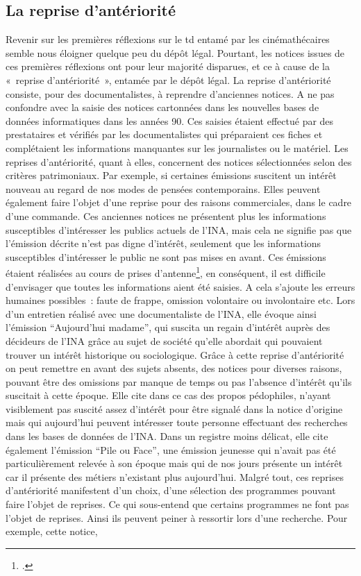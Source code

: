 \subsection{La reprise d'antériorité}

Revenir sur les premières réflexions sur le \gls{td} entamé par les cinémathécaires semble nous éloigner quelque peu du dépôt légal. Pourtant, les notices issues de ces premières réflexions ont pour leur majorité disparues, et ce à cause de la « reprise d’antériorité », entamée par le dépôt légal. La reprise d’antériorité consiste, pour des documentalistes, à reprendre d’anciennes notices. A ne pas confondre avec la saisie des notices cartonnées dans les nouvelles bases de données informatiques dans les années 90. Ces saisies étaient effectué par des prestataires et vérifiés par les documentalistes qui préparaient ces fiches et complétaient les informations manquantes sur les journalistes ou le matériel. Les reprises d'antériorité, quant à elles, concernent des notices sélectionnées selon des critères patrimoniaux. Par exemple, si certaines émissions suscitent un intérêt nouveau au regard de nos modes de pensées contemporains. Elles peuvent également faire l’objet d’une reprise pour des raisons commerciales, dans le cadre d’une commande. Ces anciennes notices ne présentent plus les informations susceptibles d’intéresser les publics actuels de l’INA, mais cela ne signifie pas que l’émission décrite n’est pas digne d’intérêt, seulement que les informations susceptibles d'intéresser le public ne sont pas mises en avant. Ces émissions étaient réalisées au cours de prises d’antenne\footcite[][185]{tible2023}, en conséquent, il est difficile d’envisager que toutes les informations aient été saisies. A cela s’ajoute les erreurs humaines possibles : faute de frappe, omission volontaire ou involontaire etc. Lors d’un entretien réalisé avec une documentaliste de l’INA, elle évoque ainsi l’émission \enquote{Aujourd'hui madame}, qui suscita un regain d’intérêt auprès des décideurs de l’INA grâce au sujet de société qu’elle abordait qui pouvaient trouver un intérêt historique ou sociologique. Grâce à cette reprise d’antériorité on peut remettre en avant des sujets absents, des notices pour diverses raisons, pouvant être des omissions par manque de temps ou pas l’absence d’intérêt qu’ils suscitait à cette époque. Elle cite dans ce cas des propos pédophiles, n’ayant visiblement pas suscité assez d’intérêt pour être signalé dans la notice d’origine mais qui aujourd’hui peuvent intéresser toute personne effectuant des recherches dans les bases de données de l’INA. Dans un registre moins délicat, elle cite également l'émission \enquote{Pile ou Face}, une émission jeunesse qui n'avait pas été particulièrement relevée à son époque mais qui de nos jours présente un intérêt car il présente des métiers n'existant plus aujourd'hui. Malgré tout, ces reprises d'antériorité manifestent d'un choix, d'une sélection des programmes pouvant faire l'objet de reprises. Ce qui sous-entend que certains programmes ne font pas l’objet de reprises. Ainsi ils peuvent peiner à ressortir lors d’une recherche. Pour exemple, cette notice, 